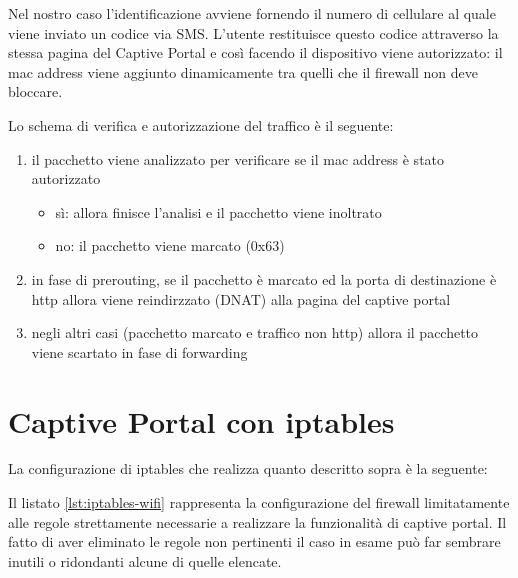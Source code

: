 Nel nostro caso l'identificazione avviene fornendo il numero di cellulare al
quale viene inviato un codice via SMS. L'utente restituisce questo codice
attraverso la stessa pagina del Captive Portal e cos\`i facendo il dispositivo
viene autorizzato: il mac address viene aggiunto dinamicamente tra quelli
che il firewall non deve bloccare.

Lo schema di verifica e autorizzazione del traffico è il seguente:
\begin{enumerate}
    \item il pacchetto viene analizzato per verificare se il mac
    address è stato autorizzato
    \begin{itemize}
        \item sì: allora finisce l'analisi e il pacchetto viene inoltrato
        \item no: il pacchetto viene marcato (0x63)
    \end{itemize}
    \item in fase di prerouting, se il pacchetto è marcato ed la porta di
    destinazione è http allora viene reindirzzato (DNAT) alla pagina del
    captive portal
    \item negli altri casi (pacchetto marcato e traffico non http) allora il
    pacchetto viene scartato in fase di forwarding
\end{enumerate}

\section{Captive Portal con iptables}
\label{lab:captive}
La configurazione di iptables che realizza quanto descritto sopra è la
seguente:

Il listato \ref{lst:iptables-wifi} rappresenta la configurazione del
firewall limitatamente alle regole strettamente necessarie a realizzare la
funzionalità di captive portal. Il fatto di aver eliminato le regole non
pertinenti il caso in esame può far sembrare inutili o ridondanti alcune di
quelle elencate.

